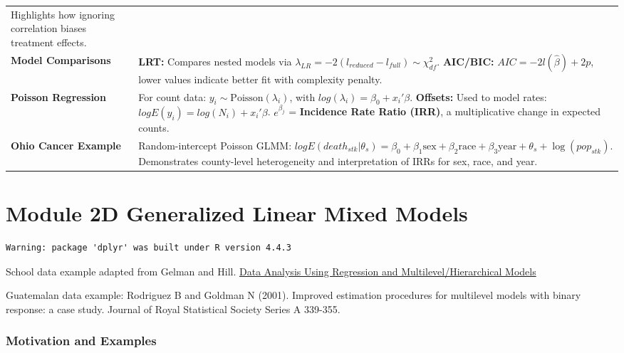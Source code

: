 \documentclass[
  letterpaper,
  DIV=11,
  numbers=noendperiod]{scrreprt}
\begin{document}
\begin{longtable}[]{@{}
  >{\raggedright\arraybackslash}p{}
  >{\raggedright\arraybackslash}p{}@{}}
Highlights how ignoring correlation biases treatment effects. \\
\textbf{Model Comparisons} & \textbf{LRT:} Compares nested models via
\(\lambda_{LR} = -2 ( l_{reduced} - l_{full} ) \sim \chi^2_{df}\).
\textbf{AIC/BIC:} \(AIC = -2 l(\hat{\beta}) + 2p\), lower values
indicate better fit with complexity penalty. \\
\textbf{Poisson Regression} & For count data:
\(y_i \sim \text{Poisson}(\lambda_i)\), with
\(log(\lambda_i) = \beta_0 + x_i'\beta\). \textbf{Offsets:} Used to
model rates: \(log E(y_i) = log(N_i) + x_i' \beta\). \(e^{\beta_j}\) =
\textbf{Incidence Rate Ratio (IRR)}, a multiplicative change in expected
counts. \\
\textbf{Ohio Cancer Example} & Random-intercept Poisson GLMM:
\(log E(death_{stk} | \theta_s) = \beta_0 + \beta_1 \text{sex} + \beta_2 \text{race} + \beta_3 \text{year} + \theta_s + \log(pop_{stk})\).
Demonstrates county-level heterogeneity and interpretation of IRRs for
sex, race, and year. \\
\end{longtable}


\hypertarget{module-2d-generalized-linear-mixed-models}{%
\chapter*{Module 2D Generalized Linear Mixed
Models}\label{module-2d-generalized-linear-mixed-models}}


\begin{verbatim}
Warning: package 'dplyr' was built under R version 4.4.3
\end{verbatim}

School data example adapted from Gelman and Hill.
\href{https://sites.stat.columbia.edu/gelman/arm/}{Data Analysis Using
Regression and Multilevel/Hierarchical Models}

Guatemalan data example: Rodriguez B and Goldman N (2001). Improved
estimation procedures for multilevel models with binary response: a case
study. Journal of Royal Statistical Society Series A 339-355.

\hypertarget{motivation-and-examples-4}{%
\subsection*{Motivation and Examples}\label{motivation-and-examples-4}}
\end{document}
